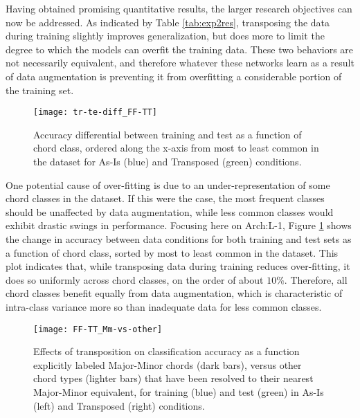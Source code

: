 Having obtained promising quantitative results, the larger research objectives can now be addressed.
As indicated by Table \ref{tab:exp2res}, transposing the data during training slightly improves generalization, but does more to limit the degree to which the models can overfit the training data.
These two behaviors are not necessarily equivalent, and therefore whatever these networks learn as a result of data augmentation is preventing it from overfitting a considerable portion of the training set.

\begin{figure}[!t]
\centering
 \centerline{\texttt{[image: tr-te-diff\_FF-TT]}}
\caption{Accuracy differential between training and test as a function of chord class, ordered along the x-axis from most to least common in the dataset for As-Is (blue) and Transposed (green) conditions.}
\label{fig:classes}
\end{figure}

One potential cause of over-fitting is due to an under-representation of some chord classes in the dataset.
If this were the case, the most frequent classes should be unaffected by data augmentation, while less common classes would exhibit drastic swings in performance.
Focusing here on Arch:L-1, Figure \ref{fig:classes} shows the change in accuracy between data conditions for both training and test sets as a function of chord class, sorted by most to least common in the dataset.
This plot indicates that, while transposing data during training reduces over-fitting, it does so uniformly across chord classes, on the order of about $10\%$.
Therefore, all chord classes benefit equally from data augmentation, which is characteristic of intra-class variance more so than inadequate data for less common classes.

\begin{figure}[!t]
\centering
\texttt{[image: FF-TT\_Mm-vs-other]}
\caption{Effects of transposition on classification accuracy as a function explicitly labeled Major-Minor chords (dark bars), versus other chord types (lighter bars) that have been resolved to their nearest Major-Minor equivalent, for training (blue) and test (green) in As-Is (left) and Transposed (right) conditions.}
\label{fig:strict_vs_others}
\end{figure}

